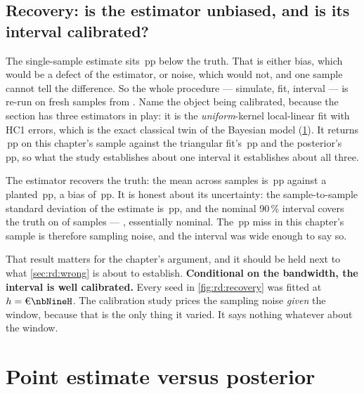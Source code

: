 \subsection*{Recovery: is the estimator unbiased, and is its interval calibrated?}

The single-sample estimate sits \nbNineRdErr{}\,pp below the truth. That is either bias, which would
be a defect of the estimator, or noise, which would not, and one sample cannot tell the difference.
So the whole procedure --- simulate, fit, interval --- is re-run on \nbNineNSeeds{} fresh samples
from . Name the object being calibrated, because the section has
three estimators in play: it is the \emph{uniform}-kernel local-linear fit with HC1 errors, which
is the exact classical twin of the Bayesian model (\cref{sec:rd:compare}). It returns
\nbNineUnif{}\,pp on this chapter's sample against the triangular fit's \nbNineRd{}\,pp and the
posterior's \nbNineBayes{}\,pp, so what the study establishes about one interval it establishes about
all three.



The estimator recovers the truth: the mean across samples is \nbNineSeedMean{}\,pp against a planted
\nbNineTrueJump{}\,pp, a bias of \nbNineSeedBias{}\,pp. It is honest about its uncertainty: the
sample-to-sample standard deviation of the estimate is \nbNineSeedSd{}\,pp, and the nominal 90\,\%
interval covers the truth on \nbNineSeedCovN{} of \nbNineNSeeds{} samples --- \pc{\nbNineSeedCovPct},
essentially nominal. The \nbNineRdErr{}\,pp miss in this chapter's sample is therefore sampling
noise, and the interval was wide enough to say so.

That result matters for the chapter's argument, and it should be held next to what
\cref{sec:rd:wrong} is about to establish. \textbf{Conditional on the bandwidth, the interval is
well calibrated.} Every seed in \cref{fig:rd:recovery} was fitted at $h = \eur{\nbNineH}$. The
calibration study prices the sampling noise \emph{given} the window, because that is the only thing
it varied. It says nothing whatever about the window.

\section{Point estimate versus posterior}
\label{sec:rd:compare}

